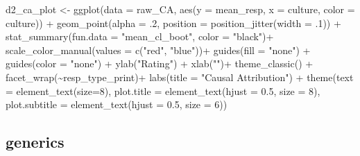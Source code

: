 \documentclass[
]{article}
\newenvironment{Shaded}{\begin{snugshade}}{\end{snugshade}}
\newcommand{\AttributeTok}[1]{\textcolor[rgb]{0.77,0.63,0.00}{#1}}
\newcommand{\DecValTok}[1]{\textcolor[rgb]{0.00,0.00,0.81}{#1}}
\newcommand{\FloatTok}[1]{\textcolor[rgb]{0.00,0.00,0.81}{#1}}
\newcommand{\FunctionTok}[1]{\textcolor[rgb]{0.00,0.00,0.00}{#1}}
\newcommand{\NormalTok}[1]{#1}
\newcommand{\OtherTok}[1]{\textcolor[rgb]{0.56,0.35,0.01}{#1}}
\newcommand{\SpecialCharTok}[1]{\textcolor[rgb]{0.00,0.00,0.00}{#1}}
\newcommand{\StringTok}[1]{\textcolor[rgb]{0.31,0.60,0.02}{#1}}
\begin{document}
\begin{Shaded}
\begin{Highlighting}[]
\NormalTok{d2\_ca\_plot }\OtherTok{\textless{}{-}} \FunctionTok{ggplot}\NormalTok{(}\AttributeTok{data =}\NormalTok{ raw\_CA, }
       \FunctionTok{aes}\NormalTok{(}\AttributeTok{y =}\NormalTok{ mean\_resp, }\AttributeTok{x =}\NormalTok{ culture, }\AttributeTok{color =}\NormalTok{ culture)) }\SpecialCharTok{+}
\FunctionTok{geom\_point}\NormalTok{(}\AttributeTok{alpha =}\NormalTok{ .}\DecValTok{2}\NormalTok{, }\AttributeTok{position =} \FunctionTok{position\_jitter}\NormalTok{(}\AttributeTok{width =}\NormalTok{ .}\DecValTok{1}\NormalTok{)) }\SpecialCharTok{+} 
                    \FunctionTok{stat\_summary}\NormalTok{(}\AttributeTok{fun.data =} \StringTok{"mean\_cl\_boot"}\NormalTok{, }\AttributeTok{color =} \StringTok{"black"}\NormalTok{)}\SpecialCharTok{+}
\FunctionTok{scale\_color\_manual}\NormalTok{(}\AttributeTok{values =} \FunctionTok{c}\NormalTok{(}\StringTok{"red"}\NormalTok{, }\StringTok{"blue"}\NormalTok{))}\SpecialCharTok{+}
\FunctionTok{guides}\NormalTok{(}\AttributeTok{fill =} \StringTok{"none"}\NormalTok{) }\SpecialCharTok{+}
\FunctionTok{guides}\NormalTok{(}\AttributeTok{color =} \StringTok{"none"}\NormalTok{) }\SpecialCharTok{+}
\FunctionTok{ylab}\NormalTok{(}\StringTok{"Rating"}\NormalTok{) }\SpecialCharTok{+} 
\FunctionTok{xlab}\NormalTok{(}\StringTok{""}\NormalTok{)}\SpecialCharTok{+}
\FunctionTok{theme\_classic}\NormalTok{() }\SpecialCharTok{+}
  \FunctionTok{facet\_wrap}\NormalTok{(}\SpecialCharTok{\textasciitilde{}}\NormalTok{resp\_type\_print)}\SpecialCharTok{+}
  \FunctionTok{labs}\NormalTok{(}\AttributeTok{title =} \StringTok{"Causal Attribution"}\NormalTok{)  }\SpecialCharTok{+} 
  \FunctionTok{theme}\NormalTok{(}\AttributeTok{text =} \FunctionTok{element\_text}\NormalTok{(}\AttributeTok{size=}\DecValTok{8}\NormalTok{),}
      \AttributeTok{plot.title =} \FunctionTok{element\_text}\NormalTok{(}\AttributeTok{hjust =} \FloatTok{0.5}\NormalTok{, }\AttributeTok{size =} \DecValTok{8}\NormalTok{), }
      \AttributeTok{plot.subtitle =} \FunctionTok{element\_text}\NormalTok{(}\AttributeTok{hjust =} \FloatTok{0.5}\NormalTok{, }\AttributeTok{size =} \DecValTok{6}\NormalTok{)) }
\end{Highlighting}
\end{Shaded}

\hypertarget{generics-1}{%
\subsection{generics}\label{generics-1}}
\end{document}

